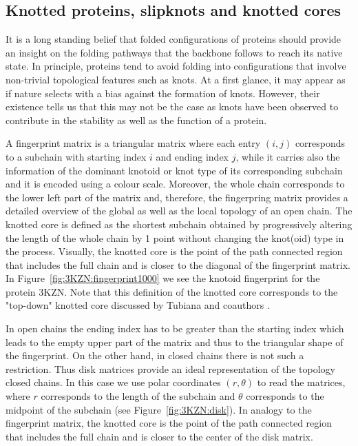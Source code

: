 \subsection{\label{sec:theory:knottedcore}Knotted proteins, slipknots and knotted cores}

It is a long standing belief that folded configurations of proteins should provide an insight on the folding pathways that the backbone follows to reach its native state\cite{Crippen74, Connolly80}. In principle, proteins tend to avoid folding into configurations that involve non-trivial topological features such as knots. At a first glance, it may appear as if nature selects with a bias against the formation of knots. However, their existence\cite{taylor2000} tells us that this may not be the case as knots have been observed to contribute in the stability as well as the function of a protein.

A fingerprint matrix is a triangular matrix where  each entry $(i,j)$ corresponds to a subchain with starting index $i$ and ending index $j$, while it carries also the information of the dominant knotoid or knot type  of its corresponding subchain and it is encoded using a colour scale. Moreover, the whole chain corresponds to the lower left part of the matrix and, therefore, the fingerpring matrix provides a detailed overview of the global as well as the local topology of an open chain.
The knotted core is defined as the shortest subchain obtained by progressively altering the length of the whole chain by 1 point without changing the knot(oid) type in the process. Visually, the knotted core is the  point of the path connected region that includes  the full chain and is closer to the diagonal of the fingerprint matrix. In Figure~\ref{fig:3KZN:fingerprint1000} we see the knotoid fingerprint for the protein 3KZN. Note that this definition of the knotted core corresponds to the "top-down" knotted core discussed by Tubiana and coauthors \cite{tubiana2011}.



In open chains the ending index has to be greater than the starting index which leads to the empty upper part of the matrix and thus to the triangular shape of the fingerprint. On the other hand, in closed chains there is not such a restriction\cite{rawdon,rawdon2}. Thus disk matrices provide an ideal representation of the topology closed chains. In this case we use polar coordinates $(r, \theta)$ to read the matrices, where $r$ corresponds to the length of the subchain and $\theta$ corresponds to the midpoint of the subchain (see Figure~\ref{fig:3KZN:disk}). In analogy to the fingerprint matrix, the knotted core is the  point of the path connected region that includes  the full chain and is closer to the center of the disk matrix.


